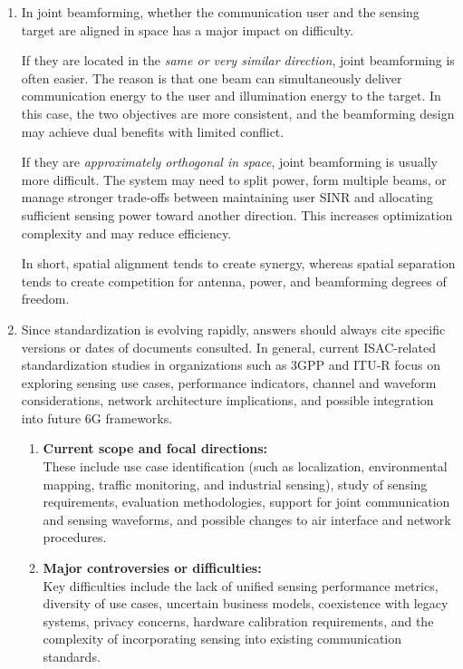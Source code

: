 \begin{enumerate}[label=\textbf{\arabic*.}, leftmargin=*]
    \item 
    In joint beamforming, whether the communication user and the sensing target are aligned in space has a major impact on difficulty.

    If they are located in the \emph{same or very similar direction}, joint beamforming is often easier. The reason is that one beam can simultaneously deliver communication energy to the user and illumination energy to the target. In this case, the two objectives are more consistent, and the beamforming design may achieve dual benefits with limited conflict.

    If they are \emph{approximately orthogonal in space}, joint beamforming is usually more difficult. The system may need to split power, form multiple beams, or manage stronger trade-offs between maintaining user SINR and allocating sufficient sensing power toward another direction. This increases optimization complexity and may reduce efficiency.

    In short, spatial alignment tends to create synergy, whereas spatial separation tends to create competition for antenna, power, and beamforming degrees of freedom.

    \item 
    Since standardization is evolving rapidly, answers should always cite specific versions or dates of documents consulted. In general, current ISAC-related standardization studies in organizations such as 3GPP and ITU-R focus on exploring sensing use cases, performance indicators, channel and waveform considerations, network architecture implications, and possible integration into future 6G frameworks.

    \begin{enumerate}[label=(\alph*)]
        \item \textbf{Current scope and focal directions:} \\
        These include use case identification (such as localization, environmental mapping, traffic monitoring, and industrial sensing), study of sensing requirements, evaluation methodologies, support for joint communication and sensing waveforms, and possible changes to air interface and network procedures.

        \item \textbf{Major controversies or difficulties:} \\
        Key difficulties include the lack of unified sensing performance metrics, diversity of use cases, uncertain business models, coexistence with legacy systems, privacy concerns, hardware calibration requirements, and the complexity of incorporating sensing into existing communication standards.


\end{enumerate}
\end{enumerate}
